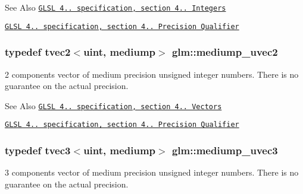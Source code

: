 \begin{DoxySeeAlso}{See Also}
\href{http://www.opengl.org/registry/doc/GLSLangSpec.4.20.8.pdf}{\tt G\-L\-S\-L 4.. specification, section 4.. Integers} 

\href{http://www.opengl.org/registry/doc/GLSLangSpec.4.20.8.pdf}{\tt G\-L\-S\-L 4.. specification, section 4.. Precision Qualifier} 
\end{DoxySeeAlso}
\hypertarget{group__core__precision_ga7ec96113b08a8435fd80dd623ffe3e05}{
\subsubsection[{mediump\-\_\-uvec2}]{\setlength{\rightskip}{0pt plus 5cm}typedef tvec2$<$uint, mediump$>$ {\bf glm\-::mediump\-\_\-uvec2}}}\label{group__core__precision_ga7ec96113b08a8435fd80dd623ffe3e05}
2 components vector of medium precision unsigned integer numbers. There is no guarantee on the actual precision.

\begin{DoxySeeAlso}{See Also}
\href{http://www.opengl.org/registry/doc/GLSLangSpec.4.20.8.pdf}{\tt G\-L\-S\-L 4.. specification, section 4.. Vectors} 

\href{http://www.opengl.org/registry/doc/GLSLangSpec.4.20.8.pdf}{\tt G\-L\-S\-L 4.. specification, section 4.. Precision Qualifier} 
\end{DoxySeeAlso}
\hypertarget{group__core__precision_ga628d87a2d3b8e287d569c6eb12d8e051}{
\subsubsection[{mediump\-\_\-uvec3}]{\setlength{\rightskip}{0pt plus 5cm}typedef tvec3$<$uint, mediump$>$ {\bf glm\-::mediump\-\_\-uvec3}}}\label{group__core__precision_ga628d87a2d3b8e287d569c6eb12d8e051}
3 components vector of medium precision unsigned integer numbers. There is no guarantee on the actual precision.

